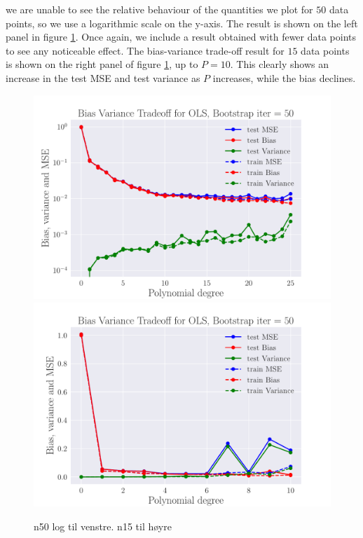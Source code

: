 \documentclass[reprint,english,notitlepage,aps,nobalancelastpage,nofootinbib]{revtex4-1}  %
\begin{document}
we are unable to see the relative behaviour of the quantities we plot for $50$ data points, so we use a logarithmic scale on the y-axis. The result is shown on the left panel in figure \ref{fig:terrain_OLS_BVT}. Once again, we include a result obtained with fewer data points to see any noticeable effect. The bias-variance trade-off result for $15$ data points is shown on the right panel of figure \ref{fig:terrain_OLS_BVT}, up to $P=10$. This clearly shows an increase in the test MSE and test variance as $P$ increases, while the bias declines.
\begin{figure}[H]
	\includegraphics[width=\linewidth]{SRTM_BVT_OLS_n50_log.pdf}
	\endminipage\hfill
	\includegraphics[width=\linewidth]{SRTM_BVT_OLS_n15.pdf}
	\endminipage
	\caption{n50 log til venstre. n15 til høyre}
  \label{fig:terrain_OLS_BVT}
\end{figure}
\end{document}

